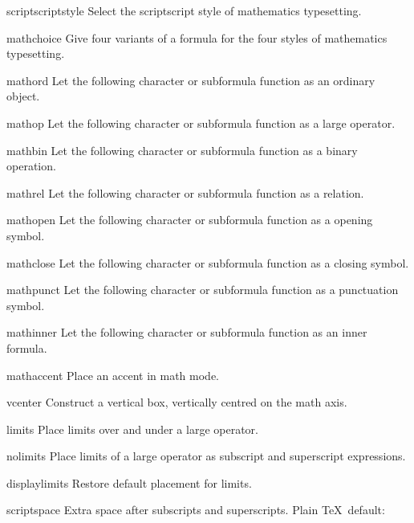 \item scriptscriptstyle 
      Select the scriptscript style of mathematics typesetting.

\item mathchoice 
      Give four variants of a formula for the four styles
      of mathematics typesetting.

\item mathord 
      Let the following character or subformula function 
      as an ordinary object.

\item mathop 
      Let the following character or subformula function 
      as a large operator.

\item mathbin 
      Let the following character or subformula function 
      as a binary operation.

\item mathrel 
      Let the following character or subformula function as a relation.

\item mathopen 
      Let the following character or subformula function 
      as a opening symbol.

\item mathclose 
      Let the following character or subformula function
      as a closing symbol.

\item mathpunct 
      Let the following character or subformula function 
      as a punctuation symbol.

\item mathinner 
      Let the following character or subformula function 
      as an inner formula.

\item mathaccent 
      Place an accent in math mode.

\item vcenter 
      Construct a vertical box, vertically centred
      on the math axis.

\item limits 
      Place limits over and under a large operator.

\item nolimits 
      Place limits of a large operator as subscript and 
      superscript expressions.

\item displaylimits 
      Restore default placement for limits.

\item scriptspace 
      Extra space after subscripts and superscripts.
      Plain \TeX\ default:~\n{0.5pt}

